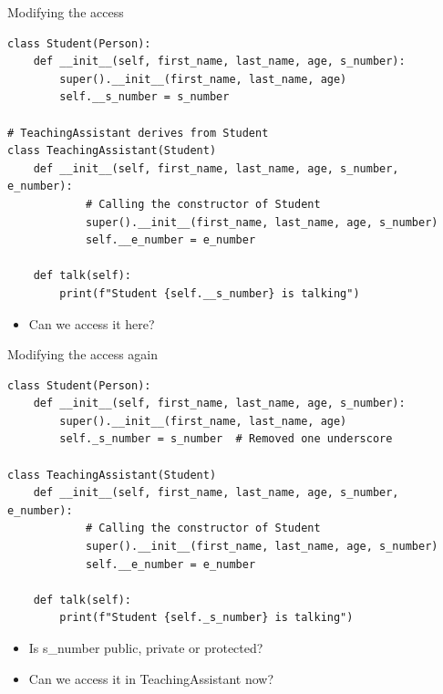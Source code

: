 \begin{frame}[fragile]{Modifying the access}
\begin{verbatim}
class Student(Person):
    def __init__(self, first_name, last_name, age, s_number):
        super().__init__(first_name, last_name, age)
        self.__s_number = s_number

# TeachingAssistant derives from Student
class TeachingAssistant(Student)
    def __init__(self, first_name, last_name, age, s_number, e_number):
            # Calling the constructor of Student
            super().__init__(first_name, last_name, age, s_number)
            self.__e_number = e_number

    def talk(self):
        print(f"Student {self.__s_number} is talking")
\end{verbatim}
\begin{itemize}
    \item Can we access it here?
\end{itemize}
\end{frame}

\begin{frame}[fragile]{Modifying the access again}
\begin{verbatim}
class Student(Person):
    def __init__(self, first_name, last_name, age, s_number):
        super().__init__(first_name, last_name, age)
        self._s_number = s_number  # Removed one underscore

class TeachingAssistant(Student)
    def __init__(self, first_name, last_name, age, s_number, e_number):
            # Calling the constructor of Student
            super().__init__(first_name, last_name, age, s_number)
            self.__e_number = e_number

    def talk(self):
        print(f"Student {self._s_number} is talking")
\end{verbatim}
\begin{itemize}
    \item Is s\_number public, private or protected?
    \pause
    \item Can we access it in TeachingAssistant now?
\end{itemize}
\end{frame}

